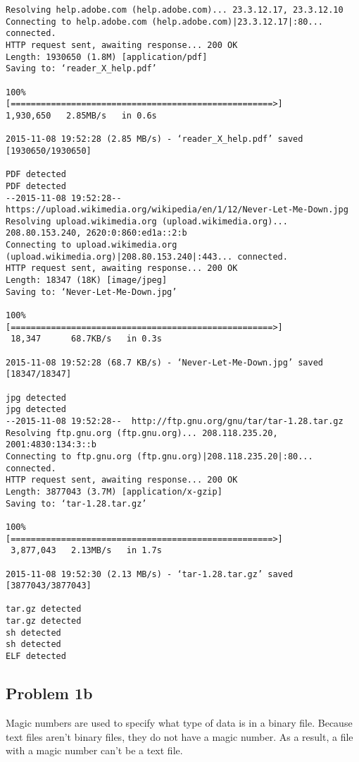 \documentclass[12pt, a4paper, oneside]{article}
\begin{document}
\begin{lstlisting}
Resolving help.adobe.com (help.adobe.com)... 23.3.12.17, 23.3.12.10
Connecting to help.adobe.com (help.adobe.com)|23.3.12.17|:80... connected.
HTTP request sent, awaiting response... 200 OK
Length: 1930650 (1.8M) [application/pdf]
Saving to: ‘reader_X_help.pdf’

100%
[====================================================>] 
1,930,650   2.85MB/s   in 0.6s   

2015-11-08 19:52:28 (2.85 MB/s) - ‘reader_X_help.pdf’ saved [1930650/1930650]

PDF detected
PDF detected
--2015-11-08 19:52:28--  https://upload.wikimedia.org/wikipedia/en/1/12/Never-Let-Me-Down.jpg
Resolving upload.wikimedia.org (upload.wikimedia.org)... 208.80.153.240, 2620:0:860:ed1a::2:b
Connecting to upload.wikimedia.org (upload.wikimedia.org)|208.80.153.240|:443... connected.
HTTP request sent, awaiting response... 200 OK
Length: 18347 (18K) [image/jpeg]
Saving to: ‘Never-Let-Me-Down.jpg’

100%
[====================================================>]
 18,347      68.7KB/s   in 0.3s   

2015-11-08 19:52:28 (68.7 KB/s) - ‘Never-Let-Me-Down.jpg’ saved [18347/18347]

jpg detected
jpg detected
--2015-11-08 19:52:28--  http://ftp.gnu.org/gnu/tar/tar-1.28.tar.gz
Resolving ftp.gnu.org (ftp.gnu.org)... 208.118.235.20, 2001:4830:134:3::b
Connecting to ftp.gnu.org (ftp.gnu.org)|208.118.235.20|:80... connected.
HTTP request sent, awaiting response... 200 OK
Length: 3877043 (3.7M) [application/x-gzip]
Saving to: ‘tar-1.28.tar.gz’

100%
[====================================================>]
 3,877,043   2.13MB/s   in 1.7s   

2015-11-08 19:52:30 (2.13 MB/s) - ‘tar-1.28.tar.gz’ saved [3877043/3877043]

tar.gz detected
tar.gz detected
sh detected
sh detected
ELF detected
\end{lstlisting}

\subsection*{Problem 1b}
Magic numbers are used to specify what type of data is in a binary file. Because text files aren't binary files, they do not have a magic number. As a result, a file with a magic number can't be a text file.

\pagebreak
\end{document}
